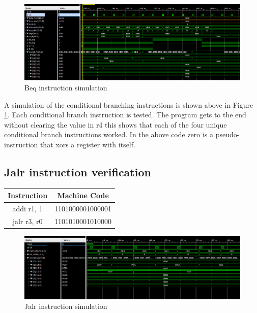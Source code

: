 \documentclass{article}
\begin{document}
	\begin{figure}[H]
		\centering
		\includegraphics[width=7in]{img/beqinstest.png}
		\caption{Beq instruction simulation}
		\label{fig:beqinstest}
	\end{figure}
	
	\begin{par}
		A simulation of the conditional branching instructions is shown above in Figure \ref{fig:beqinstest}. Each conditional branch instruction is tested. The program gets to the end without clearing the value in r4 this shows that each of the four unique conditional branch instructions worked. In the above code zero is a pseudo-instruction that xors a register with itself. 
	\end{par}
	\newpage
	
	\subsection{Jalr instruction verification}
		\vspace{.5cm}
		\begin{center}
			\begin{tabular}{|c|c|}
				\hline 
				\textbf{Instruction} & \textbf{Machine Code} \\ 
				\hline 
				addi r1, 1 & 1101000001000001 \\ 
				jalr r3, r0 & 1101010001010000 \\
				\hline 
			\end{tabular} 
		\end{center}
		
		\begin{figure}[H]
			\centering
			\includegraphics[width=7in]{img/jalrinstest.png}
			\caption{Jalr instruction simulation}
			\label{fig:jalrinstest}
		\end{figure}
		
\end{document}
